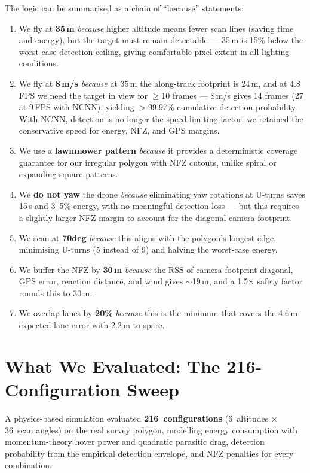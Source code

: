 \documentclass[10pt,a4paper]{article}
\def\textdegree{deg}%
\begin{document}
The logic can be summarised as a chain of ``because'' statements:

\begin{enumerate}[nosep, leftmargin=2em]
  \item We fly at \textbf{35\,m} \emph{because} higher altitude means fewer scan lines (saving time and energy), but the target must remain detectable --- 35\,m is 15\% below the worst-case detection ceiling, giving comfortable pixel extent in all lighting conditions.
  \item We fly at \textbf{8\,m/s} \emph{because} at 35\,m the along-track footprint is 24\,m, and at 4.8\,FPS we need the target in view for $\geq$10 frames --- 8\,m/s gives 14 frames (27 at 9\,FPS with NCNN), yielding $>$99.97\% cumulative detection probability. With NCNN, detection is no longer the speed-limiting factor; we retained the conservative speed for energy, NFZ, and GPS margins.
  \item We use a \textbf{lawnmower pattern} \emph{because} it provides a deterministic coverage guarantee for our irregular polygon with NFZ cutouts, unlike spiral or expanding-square patterns.
  \item We \textbf{do not yaw} the drone \emph{because} eliminating yaw rotations at U-turns saves 15\,s and 3--5\% energy, with no meaningful detection loss --- but this requires a slightly larger NFZ margin to account for the diagonal camera footprint.
  \item We scan at \textbf{70\textdegree} \emph{because} this aligns with the polygon's longest edge, minimising U-turns (5 instead of 9) and halving the worst-case energy.
  \item We buffer the NFZ by \textbf{30\,m} \emph{because} the RSS of camera footprint diagonal, GPS error, reaction distance, and wind gives $\sim$19\,m, and a 1.5$\times$ safety factor rounds this to 30\,m.
  \item We overlap lanes by \textbf{20\%} \emph{because} this is the minimum that covers the 4.6\,m expected lane error with 2.2\,m to spare.
\end{enumerate}


\section{What We Evaluated: The 216-Configuration Sweep}\label{sec:df-evaluation}

A physics-based simulation evaluated \textbf{216~configurations} (6~altitudes $\times$ 36~scan angles) on the real survey polygon, modelling energy consumption with momentum-theory hover power and quadratic parasitic drag, detection probability from the empirical detection envelope, and NFZ penalties for every combination.
\end{document}
